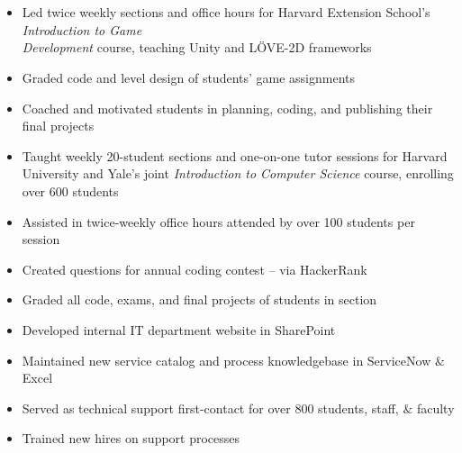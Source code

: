 \documentclass[hidelinks, 11pt]{article}
\begin{document}
\section*{}
\begin{addmargin}{.5in}

    \begin{itemize}\setlength\itemsep{-4pt}
      \item{Led twice weekly sections and office hours for Harvard Extension School's \emph{Introduction to Game\\ Development} course, teaching Unity and LÖVE-2D frameworks}
      \item{Graded code and level design of students' game assignments}
      \item{Coached and motivated students in planning, coding, and publishing their final projects}
    \end{itemize}
    \begin{itemize}\setlength\itemsep{-4pt}
      \item{Taught weekly 20-student sections and one-on-one tutor sessions for Harvard University and Yale's joint \emph{Introduction to Computer Science} course, enrolling over 600 students}
      \item{Assisted in twice-weekly office hours attended by over 100 students per session}
      \item{Created questions for annual coding contest – via HackerRank}
      \item{Graded all code, exams, and final projects of students in section}
    \end{itemize}
    \begin{itemize}\setlength\itemsep{-4pt}
        \item{Developed internal IT department website in SharePoint}
          \item{Maintained new service catalog and process knowledgebase in ServiceNow $\&$ Excel}
          \item{Served as technical support first-contact for over 800 students, staff, $\&$ faculty}
          \item{Trained new hires on support processes}
      \end{itemize}
\end{addmargin}
\vspace{-6pt}

\end{document}
